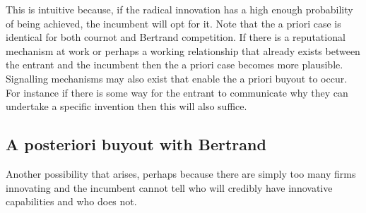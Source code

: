 \documentclass[11pt]{article}
\begin{document}
This is intuitive because, if the radical innovation has a high enough probability of being achieved, the incumbent will opt for it. Note that the a priori case is identical for both cournot and Bertrand competition. If there is a reputational mechanism at work or perhaps a working relationship that already exists between the entrant and the incumbent then the a priori case becomes more plausible. Signalling mechanisms may also exist that enable the a priori buyout to occur. For instance if there is some way for the entrant to communicate why they can undertake a specific invention then this will also suffice. 

\subsection*{A posteriori buyout with Bertrand}

Another possibility that arises, perhaps because there are simply too many firms innovating and the incumbent cannot tell who will credibly have innovative capabilities and who does not. 

\end{document}
